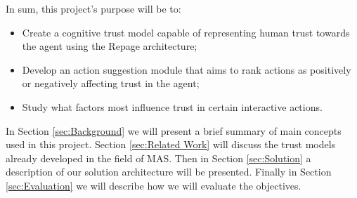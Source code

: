 In sum, this project's purpose will be to:
\begin{itemize}
	\item Create a cognitive trust model capable of representing human trust towards the agent using the Repage architecture;
	\item Develop an action suggestion module that aims to rank actions as positively or negatively affecting trust in the agent;
	\item Study what factors most influence trust in certain interactive actions.
\end{itemize}


In Section \ref{sec:Background} we will present a brief summary of main concepts used in this project. Section \ref{sec:Related Work} will discuss the trust models already developed in the field of \ac{MAS}. Then in Section \ref{sec:Solution} a description of our solution architecture will be presented. Finally in Section \ref{sec:Evaluation} we will describe how we will evaluate the objectives.


